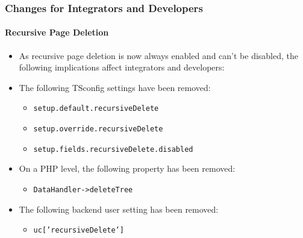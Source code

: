 %

\begin{frame}[fragile]
	\frametitle{Changes for Integrators and Developers}
	\framesubtitle{Recursive Page Deletion}

	\lstset{basicstyle=\tiny\ttfamily}

	\begin{itemize}
		\item As recursive page deletion is now always enabled and can't be disabled,
			the following implications affect integrators and developers:
		\item The following TSconfig settings have been removed:

			\begin{itemize}
				\item \texttt{setup.default.recursiveDelete}
				\item \texttt{setup.override.recursiveDelete}
				\item \texttt{setup.fields.recursiveDelete.disabled}
			\end{itemize}

		\item On a PHP level, the following property has been removed:

			\begin{itemize}
				\item \texttt{DataHandler->deleteTree}
			\end{itemize}

		\item The following backend user setting has been removed:

			\begin{itemize}
				\item \texttt{uc['recursiveDelete']}
			\end{itemize}

	\end{itemize}

\end{frame}


